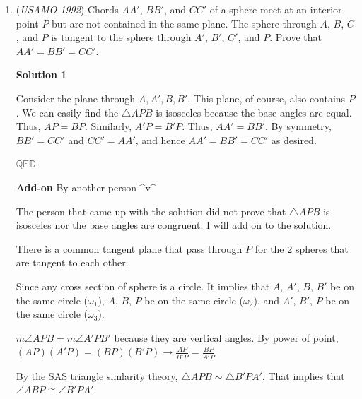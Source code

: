 \begin{enumerate}
 $max{(a_9)}=a_{10}-1\leq 246$

 Let ${a_1, a_2, \dots, a_{10}}$ be a $10$-$b$ set where the first $8$ elements are the same as the previous set. Then, $256+a_9+a_{10}$ is not expressible as $\sigma(Y)$. Thus, $b\leq 255+a_9+a_{10}\leq 748$.

 In order to create a $11$-$d$ set with $d>748$ and the first $10$ elements being the ones on the previous set, $a_{11}\leq 749$ because we need to make $749$ expressible as $\sigma(Y)$. Note that $b+1+a_{11}$ is not expressible, thus $d<b+1+a_{11}\leq 1498$.

 
Done but not elegant...

 


	\item (\textit{USAMO 1992}) Chords $AA'$, $BB'$, and $CC'$ of a sphere meet at an interior point $P$ but are not contained in the same plane.  The sphere through $A$, $B$, $C$, and $P$ is tangent to the sphere through $A'$, $B'$, $C'$, and $P$.  Prove that $AA'=BB'=CC'$.


 



\textbf{Solution 1}

Consider the plane through $A,A',B,B'$.  This plane, of course, also contains $P$. We can easily find the $\triangle APB$ is isosceles because the base angles are equal. Thus, $AP=BP$. Similarly, $A'P=B'P$. Thus, $AA'=BB'$. By symmetry, $BB'=CC'$ and $CC'=AA'$, and hence $AA'=BB'=CC'$ as desired. 

 $\mathbb{QED.}$

 \textbf{Add-on} By another person \textasciicircum{}v\textasciicircum{}

 The person that came up with the solution did not prove that  $\triangle APB$ is isosceles nor the base angles are congruent. I will add on to the solution.

 There is a common tangent plane that pass through $P$ for the $2$ spheres that are tangent to each other.

 
Since any cross section of sphere is a circle. It implies that $A$, $A'$, $B$, $B'$ be on the same circle ($\omega_1$), $A$, $B$, $P$ be on the same circle ($\omega_2$), and $A'$, $B'$, $P$ be on the same circle ($\omega_3$).

 $m\angle APB= m\angle A'PB'$ because they are vertical angles. By power of point, $(AP)(A'P)=(BP)(B'P)\rightarrow\frac{AP}{B'P}=\frac{BP}{A'P}$

 By the SAS triangle simlarity theory, $\triangle APB \sim\triangle B'PA'$. That implies that $\angle ABP\cong\angle B'PA'$.


\end{enumerate}
